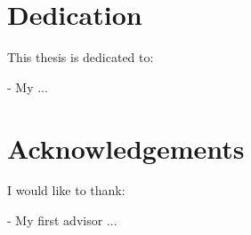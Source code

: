 \chapter*{Dedication}
\label{ch:dedication}

This thesis is dedicated to:

\begin{flushleft}
- My ...
\end{flushleft}

\chapter*{Acknowledgements}
\label{ch:acknowledgements}

I would like to thank:

\begin{flushleft}
- My first advisor ...
\end{flushleft}